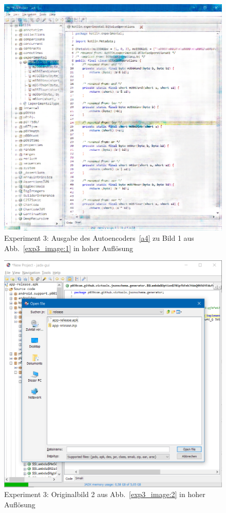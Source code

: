 \begin{figure} [ht]
  \centering
  \includegraphics[width=\textwidth]{bilder/result_exp3/1_pred_a4.png}

  \caption{Experiment 3: Ausgabe des Autoencoders~\ref{a4} zu Bild 1 aus Abb.~\ref{exp3_image:1} in hoher Auflösung}
\end{figure}

\label{sec:appendix:exp3_2}
\begin{figure} [ht]
  \centering
  \includegraphics[width=\textwidth]{bilder/result_exp3/2.png}

  \caption{Experiment 3: Originalbild 2 aus Abb.~\ref{exp3_image:2} in hoher Auflösung}
\end{figure}

